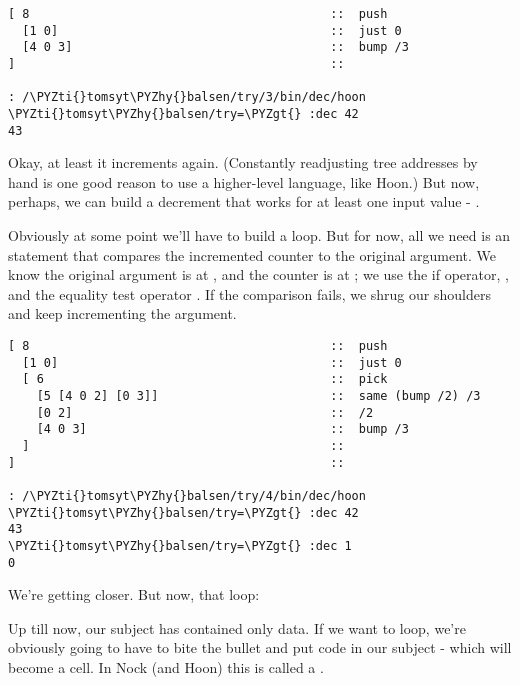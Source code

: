 \begin{framed_shaded}
\begin{Verbatim}[fontsize=\relsize{-2.5},fontseries=b,commandchars=\\\{\}]
[ 8                                          ::  push
  [1 0]                                      ::  just 0
  [4 0 3]                                    ::  bump /3
]                                            ::

: /\PYZti{}tomsyt\PYZhy{}balsen/try/3/bin/dec/hoon
\PYZti{}tomsyt\PYZhy{}balsen/try=\PYZgt{} :dec 42
43
\end{Verbatim}
\end{framed_shaded}
Okay, at least it increments again.  (Constantly readjusting tree
addresses by hand is one good reason to use a higher-level
language, like Hoon.) But now, perhaps, we can build a decrement
that works for at least one input value - .

Obviously at some point we'll have to build a loop.  But for now,
all we need is an  statement that compares the incremented
counter to the original argument.  We know the original argument
is at , and the counter is at ; we use the if operator,
, and the equality test operator .  If the comparison
fails, we shrug our shoulders and keep incrementing the argument.

\begin{framed_shaded}
\begin{Verbatim}[fontsize=\relsize{-2.5},fontseries=b,commandchars=\\\{\}]
[ 8                                          ::  push
  [1 0]                                      ::  just 0
  [ 6                                        ::  pick
    [5 [4 0 2] [0 3]]                        ::  same (bump /2) /3
    [0 2]                                    ::  /2
    [4 0 3]                                  ::  bump /3
  ]                                          :: 
]                                            :: 

: /\PYZti{}tomsyt\PYZhy{}balsen/try/4/bin/dec/hoon
\PYZti{}tomsyt\PYZhy{}balsen/try=\PYZgt{} :dec 42
43
\PYZti{}tomsyt\PYZhy{}balsen/try=\PYZgt{} :dec 1
0
\end{Verbatim}
\end{framed_shaded}
We're getting closer.  But now, that loop:

Up till now, our subject has contained only data.  If we want to
loop, we're obviously going to have to bite the bullet and put
code in our subject - which will become a  cell.
In Nock (and Hoon) this is called a .

